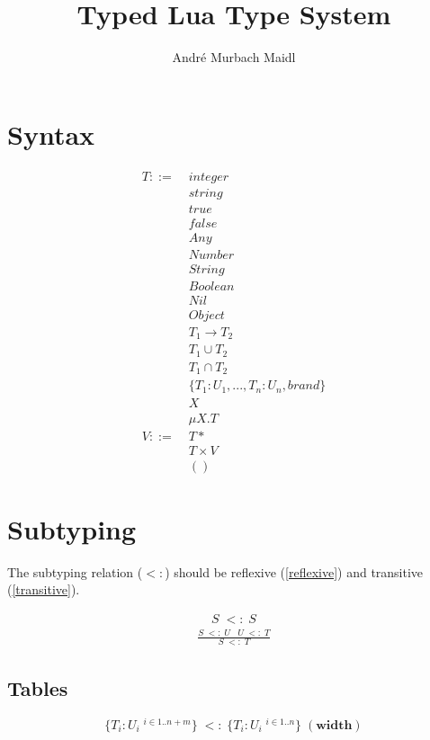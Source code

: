 \documentclass[12pt]{article}
\title{Typed Lua Type System}
\author{André Murbach Maidl}
\begin{document}
\maketitle

\section{Syntax}

\begin{align*}
T ::= \; & integer\\
& string\\
& true\\
& false\\
& Any\\
& Number\\
& String\\
& Boolean\\
& Nil\\
& Object\\
& T_1 \rightarrow T_2\\
& T_1 \cup T_2\\
& T_1 \cap T_2\\
& \{ T_1:U_1, ..., T_n:U_n, brand \}\\
& X\\
& \mu X.T\\
V ::= \; & T*\\
& T \times V\\
& ()
\end{align*}

\section{Subtyping}

The subtyping relation ($<:$) should be reflexive (\ref{reflexive})
and transitive (\ref{transitive}).

\begin{align}
\label{reflexive}
S \; <: \; S
\end{align}
\begin{align}
\label{transitive}
\frac{S \; <: \; U \;\;\; U\;  <: \; T}{S \; <: \; T}
\end{align}

\subsection{Tables}

\[
\{T_{i}:U_{i} \; ^{i \in 1..n+m}\} \;
<: \;
\{T_{i}:U_{i} \; ^{i \in 1..n}\} \; (\textbf{width})
\]
\end{document}
